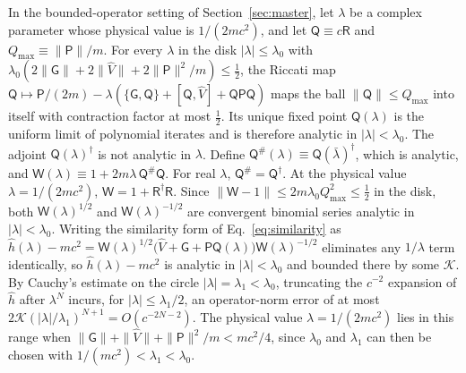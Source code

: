 \documentclass[aps,prd,onecolumn,tightenlines,nofootinbib,notitlepage,11pt,floatfix]{revtex4-2}
\theoremstyle{indentedtheorem}
\begin{document}
In the bounded-operator setting of Section~\ref{sec:master}, let $\lambda$ be a complex parameter whose physical value is $1/(2mc^2)$, and let $\mathsf{Q} \equiv c\mathsf{R}$ and $Q_\text{max} \equiv \|\mathsf{P}\|/m$. For every $\lambda$ in the disk $|\lambda|\le\lambda_0$ with $\lambda_0(2\|\mathsf{G}\|+2\|\hat{V}\|+2\|\mathsf{P}\|^2/m)\le\tfrac{1}{2}$, the Riccati map $\mathsf{Q} \mapsto \mathsf{P}/(2m) - \lambda(\{\mathsf{G},\mathsf{Q}\}+[\mathsf{Q},\hat{V}]+\mathsf{Q}\mathsf{P}\mathsf{Q})$ maps the ball $\|\mathsf{Q}\|\le Q_\text{max}$ into itself with contraction factor at most $\tfrac{1}{2}$. Its unique fixed point $\mathsf{Q}(\lambda)$ is the uniform limit of polynomial iterates and is therefore analytic in $|\lambda|<\lambda_0$. The adjoint $\mathsf{Q}(\lambda)^\dagger$ is not analytic in $\lambda$. Define $\mathsf{Q}^\#(\lambda) \equiv \mathsf{Q}(\bar{\lambda})^\dagger$, which is analytic, and $\mathsf{W}(\lambda) \equiv 1 + 2m\lambda\,\mathsf{Q}^\#\mathsf{Q}$. For real $\lambda$, $\mathsf{Q}^\# = \mathsf{Q}^\dagger$. At the physical value $\lambda=1/(2mc^2)$, $\mathsf{W} = 1+\mathsf{R}^\dagger\mathsf{R}$. Since $\|\mathsf{W}-1\| \le 2m\lambda_0 Q_\text{max}^2 \le \tfrac{1}{2}$ in the disk, both $\mathsf{W}(\lambda)^{1/2}$ and $\mathsf{W}(\lambda)^{-1/2}$ are convergent binomial series analytic in $|\lambda|<\lambda_0$. Writing the similarity form of Eq.~\eqref{eq:similarity} as $\hat{h}(\lambda) - mc^2 = \mathsf{W}(\lambda)^{1/2}\big(\hat{V}+\mathsf{G}+\mathsf{P}\mathsf{Q}(\lambda)\big)\mathsf{W}(\lambda)^{-1/2}$ eliminates any $1/\lambda$ term identically, so $\hat{h}(\lambda) - mc^2$ is analytic in $|\lambda|<\lambda_0$ and bounded there by some $\mathcal{K}$. By Cauchy's estimate on the circle $|\lambda| = \lambda_1<\lambda_0$, truncating the $c^{-2}$ expansion of $\hat{h}$ after $\lambda^N$ incurs, for $|\lambda|\le \lambda_1/2$, an operator-norm error of at most $2\mathcal{K}(|\lambda|/\lambda_1)^{N+1} = O(c^{-2N-2})$. The physical value $\lambda=1/(2mc^2)$ lies in this range when $\|\mathsf{G}\|+\|\hat{V}\|+\|\mathsf{P}\|^2/m<mc^2/4$, since $\lambda_0$ and $\lambda_1$ can then be chosen with $1/(mc^2)<\lambda_1<\lambda_0$.
\end{document}
